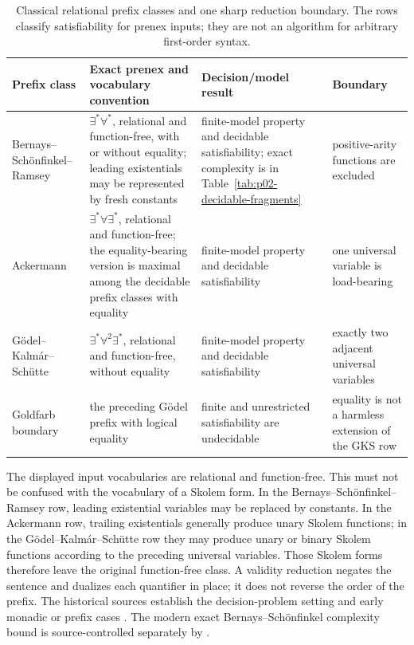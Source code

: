 \begin{table}[htbp]
\centering\small
\begin{tabularx}{\textwidth}{@{}l X X X@{}}
\toprule
Prefix class & Exact prenex and vocabulary convention & Decision/model result &
Boundary \\
\midrule
Bernays--Sch\"onfinkel--Ramsey &
\(\exists^{*}\forall^{*}\), relational and function-free, with or without equality;
leading existentials may be represented by fresh constants &
finite-model property and decidable satisfiability; exact complexity is in
Table~\ref{tab:p02-decidable-fragments} &
positive-arity functions are excluded \\
Ackermann &
\(\exists^{*}\forall\exists^{*}\), relational and function-free; the
equality-bearing version is maximal among the decidable prefix classes with
equality &
finite-model property and decidable satisfiability &
one universal variable is load-bearing \\
G\"odel--Kalm\'ar--Sch\"utte &
\(\exists^{*}\forall^{2}\exists^{*}\), relational and function-free, without
equality &
finite-model property and decidable satisfiability &
exactly two adjacent universal variables \\
Goldfarb boundary &
the preceding G\"odel prefix with logical equality &
finite and unrestricted satisfiability are undecidable &
equality is not a harmless extension of the GKS row \\
\bottomrule
\end{tabularx}
\caption{Classical relational prefix classes and one sharp reduction boundary.
The rows classify satisfiability for prenex inputs; they are not an algorithm
for arbitrary first-order syntax.}
\label{tab:p09-prefix-classes}
\end{table}

The displayed input vocabularies are relational and function-free.  This must
not be confused with the vocabulary of a Skolem form.  In the
Bernays--Sch\"onfinkel--Ramsey row, leading existential variables may be
replaced by constants.  In the Ackermann row, trailing existentials generally
produce unary Skolem functions; in the G\"odel--Kalm\'ar--Sch\"utte row they
may produce unary or binary Skolem functions according to the preceding
universal variables.  Those Skolem forms therefore leave the original
function-free class.  A validity reduction negates the sentence and dualizes
each quantifier in place; it does not reverse the order of the prefix.  The
historical sources establish the decision-problem setting and early monadic or
prefix cases \cite{Lowenheim1915,Behmann1922,BorgerGradelGurevich1997}.
The modern exact Bernays--Sch\"onfinkel complexity bound is source-controlled
separately by \textcite{Lewis1980}.

